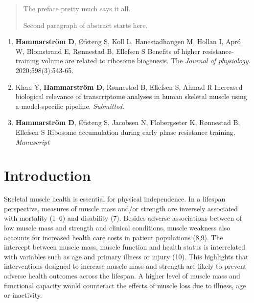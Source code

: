\documentclass[twoside,10pt]{gihclass} %
\def\labelenumi{\Roman{enumi}.}
\begin{document}
  \begin{abstract}
    The preface pretty much says it all.
    
    \par
    
    Second paragraph of abstract starts here.
  \end{abstract}
  \begin{listofpapers}
    \begin{enumerate}
    \def\labelenumi{\Roman{enumi}.}
    \item
      \textbf{Hammarström D}, Øfsteng S, Koll L, Hanestadhaugen M, Hollan I, Apró W, Blomstrand E, Rønnestad B, Ellefsen S Benefits of higher resistance-training volume are related to ribosome biogenesis. The \emph{Journal of physiology}. 2020;598(3):543-65.
    \item
      Khan Y, \textbf{Hammarström D}, Rønnestad B, Ellefsen S, Ahmad R Increased biological relevance of transcriptome analyses in human skeletal muscle using a model-specific pipeline. \emph{Submitted.}
    \item
      \textbf{Hammarström D}, Øfsteng S, Jacobsen N, Flobergseter K, Rønnestad B, Ellefsen S Ribosome accumulation during early phase resistance training. \emph{Manuscript}
    \end{enumerate}
  \end{listofpapers}

  \hypersetup{linkcolor=black}
  \setcounter{tocdepth}{2}
  \tableofcontents

  \listoftables

  \listoffigures




\mainmatter %
\pagestyle{fancyplain} %

\setcounter{DefaultLines}{3}

\hypertarget{introduction}{%
\chapter{Introduction}\label{introduction}}

\lettrine{S}keletal muscle health is essential for physical independence. In a lifespan perspective, measures of muscle mass and/or strength are inversely associated with mortality
(1--6)
and disability
(7).
Besides adverse associations between of low muscle mass and strength and clinical conditions, muscle weakness also accounts for increased health care costs in patient populations
(8,9).
The intercept between muscle mass, muscle function and health status is interrelated with variables such as age and primary illness or injury
(10).
This highlights that interventions designed to increase muscle mass and strength are likely to prevent adverse health outcomes across the lifespan. A higher level of muscle mass and functional capacity would counteract the effects of muscle loss due to illness, age or inactivity.
\end{document}
